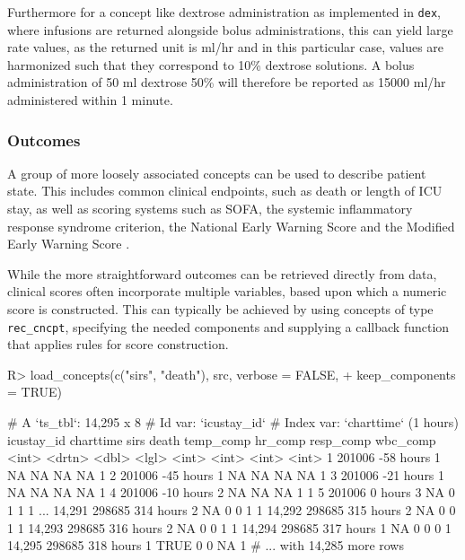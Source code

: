 \documentclass[
  notitle]{jss}
\begin{document}
Furthermore for a concept like dextrose administration as implemented in
\texttt{dex}, where infusions are returned alongside bolus
administrations, this can yield large rate values, as the returned unit
is ml/hr and in this particular case, values are harmonized such that
they correspond to 10\% dextrose solutions. A bolus administration of 50
ml dextrose 50\% will therefore be reported as 15000 ml/hr administered
within 1 minute.

\hypertarget{outcomes}{%
\subsubsection{Outcomes}\label{outcomes}}

A group of more loosely associated concepts can be used to describe
patient state. This includes common clinical endpoints, such as death or
length of ICU stay, as well as scoring systems such as SOFA, the
systemic inflammatory response syndrome \citep[SIRS;][]{bone1992}
criterion, the National Early Warning Score \citep[NEWS;][]{jones2012}
and the Modified Early Warning Score \citep[MEWS;][]{subbe2001}.

While the more straightforward outcomes can be retrieved directly from
data, clinical scores often incorporate multiple variables, based upon
which a numeric score is constructed. This can typically be achieved by
using concepts of type \texttt{rec\_cncpt}, specifying the needed
components and supplying a callback function that applies rules for
score construction.

\begin{CodeChunk}
\begin{CodeInput}
R> load_concepts(c("sirs", "death"), src, verbose = FALSE,
+               keep_components = TRUE)
\end{CodeInput}
\begin{CodeOutput}
# A `ts_tbl`: 14,295 x 8
# Id var:     `icustay_id`
# Index var:  `charttime` (1 hours)
       icustay_id charttime  sirs death temp_comp hr_comp resp_comp wbc_comp
            <int> <drtn>    <dbl> <lgl>     <int>   <int>     <int>    <int>
     1     201006 -58 hours     1 NA           NA      NA        NA        1
     2     201006 -45 hours     1 NA           NA      NA        NA        1
     3     201006 -21 hours     1 NA           NA      NA        NA        1
     4     201006 -10 hours     2 NA           NA      NA         1        1
     5     201006   0 hours     3 NA            0       1         1        1
   ...
14,291     298685 314 hours     2 NA            0       0         1        1
14,292     298685 315 hours     2 NA            0       0         1        1
14,293     298685 316 hours     2 NA            0       0         1        1
14,294     298685 317 hours     1 NA            0       0         0        1
14,295     298685 318 hours     1 TRUE          0       0        NA        1
# ... with 14,285 more rows
\end{CodeOutput}
\end{CodeChunk}
\end{document}
